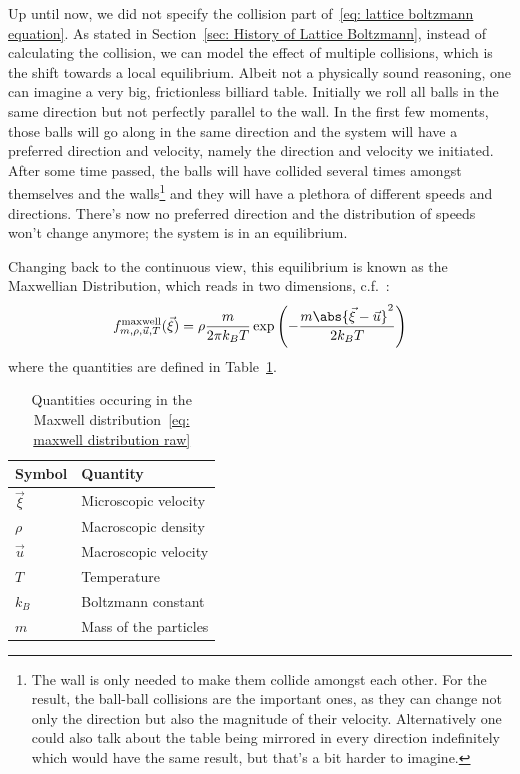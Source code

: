 Up until now, we did not specify the collision part of~\eqref{eq: lattice boltzmann equation}.
As stated in Section~\ref{sec: History of Lattice Boltzmann}, instead of calculating the collision, we can model the effect of multiple collisions, which is the shift towards a local equilibrium.
Albeit not a physically sound reasoning, one can imagine a very big, frictionless billiard table.
Initially we roll all balls in the same direction but not perfectly parallel to the wall.
In the first few moments, those balls will go along in the same direction and the system will have a preferred direction and velocity, namely the direction and velocity we initiated.
After some time passed, the balls will have collided several times amongst themselves and the walls\footnote{The wall is only needed to make them collide amongst each other. For the result, the ball-ball collisions are the important ones, as they can change not only the direction but also the magnitude of their velocity. Alternatively one could also talk about the table being mirrored in every direction indefinitely which would have the same result, but that's a bit harder to imagine.} and they will have a plethora of different speeds and directions.
There's now no preferred direction and the distribution of speeds won't change anymore; the system is in an equilibrium.

Changing back to the continuous view, this equilibrium is known as the Maxwellian Distribution, which reads in two dimensions, c.f.~\cite{succi2001lattice}:
\begin{equation}
  \label{eq: maxwell distribution raw}
  f_{m, \rho, \vec{u}, T}^{\text{maxwell}}(\vec{\xi}) = \rho \frac{m}{2\pi k_B T} \exp \left( - \frac{m\abs{\vec{\xi}-\vec{u}}^2}{2 k_B T}\right)
\end{equation}
where the quantities are defined in Table~\ref{table: maxwell quantities}.
\begin{table} [h]
\centering
  \begin{tabular}{@{}ll@{}}
    \toprule
    Symbol & Quantity  \\
    \midrule
    $\vec{\xi}$  & Microscopic velocity  \\
    $\rho$ & Macroscopic density     \\
    $\vec{u}$    & Macroscopic velocity   \\
    $T$    & Temperature   \\
    $k_B$  & Boltzmann constant \\
    $m$    & Mass of the particles   \\
    \bottomrule
  \end{tabular}
\caption{Quantities occuring in the Maxwell distribution~\eqref{eq: maxwell distribution raw}}
\label{table: maxwell quantities}
\end{table}

